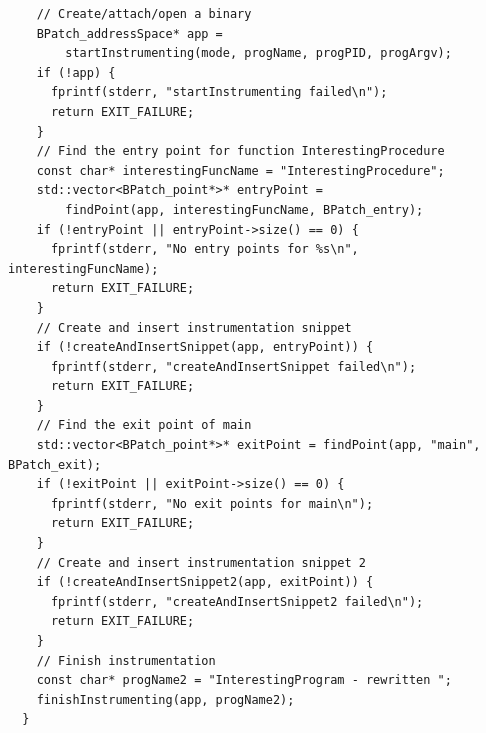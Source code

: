 \begin{lstlisting}
    // Create/attach/open a binary
    BPatch_addressSpace* app =
        startInstrumenting(mode, progName, progPID, progArgv);
    if (!app) {
      fprintf(stderr, "startInstrumenting failed\n");
      return EXIT_FAILURE;
    }
    // Find the entry point for function InterestingProcedure
    const char* interestingFuncName = "InterestingProcedure";
    std::vector<BPatch_point*>* entryPoint =
        findPoint(app, interestingFuncName, BPatch_entry);
    if (!entryPoint || entryPoint->size() == 0) {
      fprintf(stderr, "No entry points for %s\n", interestingFuncName);
      return EXIT_FAILURE;
    }
    // Create and insert instrumentation snippet
    if (!createAndInsertSnippet(app, entryPoint)) {
      fprintf(stderr, "createAndInsertSnippet failed\n");
      return EXIT_FAILURE;
    }
    // Find the exit point of main
    std::vector<BPatch_point*>* exitPoint = findPoint(app, "main", BPatch_exit);
    if (!exitPoint || exitPoint->size() == 0) {
      fprintf(stderr, "No exit points for main\n");
      return EXIT_FAILURE;
    }
    // Create and insert instrumentation snippet 2
    if (!createAndInsertSnippet2(app, exitPoint)) {
      fprintf(stderr, "createAndInsertSnippet2 failed\n");
      return EXIT_FAILURE;
    }
    // Finish instrumentation
    const char* progName2 = "InterestingProgram - rewritten ";
    finishInstrumenting(app, progName2);
  }

\end{lstlisting}
